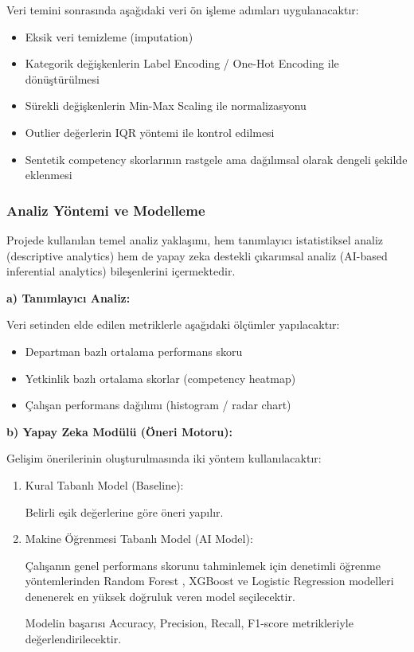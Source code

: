 \documentclass[a4paper,12pt]{article}
\begin{document}
\noindent Veri temini sonrasında aşağıdaki veri ön işleme adımları uygulanacaktır:
\begin{itemize}
    \item Eksik veri temizleme (imputation)
    \item Kategorik değişkenlerin Label Encoding / One-Hot Encoding ile dönüştürülmesi
    \item Sürekli değişkenlerin Min-Max Scaling ile normalizasyonu
    \item Outlier değerlerin IQR yöntemi ile kontrol edilmesi \cite{tukey1977exploratory}
    \item Sentetik competency skorlarının rastgele ama dağılımsal olarak dengeli şekilde eklenmesi
\end{itemize}

\subsubsection*{Analiz Yöntemi ve Modelleme}
\noindent Projede kullanılan temel analiz yaklaşımı, hem tanımlayıcı istatistiksel analiz (descriptive analytics) hem de yapay zeka destekli çıkarımsal analiz (AI-based inferential analytics) bileşenlerini içermektedir.

\vspace{10pt} \textbf{a) Tanımlayıcı Analiz:}

Veri setinden elde edilen metriklerle aşağıdaki ölçümler yapılacaktır:

\begin{itemize}
    \item Departman bazlı ortalama performans skoru
    \item Yetkinlik bazlı ortalama skorlar (competency heatmap)
    \item Çalışan performans dağılımı (histogram / radar chart)
\end{itemize}

\textbf{b) Yapay Zeka Modülü (Öneri Motoru):}

Gelişim önerilerinin oluşturulmasında iki yöntem kullanılacaktır:

\begin{enumerate}
    \item Kural Tabanlı Model (Baseline):
    
    Belirli eşik değerlerine göre öneri yapılır.
    \item Makine Öğrenmesi Tabanlı Model (AI Model):
    
    Çalışanın genel performans skorunu tahminlemek için denetimli öğrenme yöntemlerinden Random Forest \cite{breiman2001random}, XGBoost \cite{chen2016xgboost} ve Logistic Regression \cite{hosmer2013applied} modelleri denenerek en yüksek doğruluk veren model seçilecektir.

    Modelin başarısı Accuracy, Precision, Recall, F1-score metrikleriyle \cite{han2011data} değerlendirilecektir.
\end{enumerate}
\end{document}
